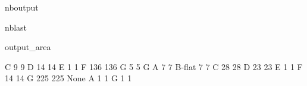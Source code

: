 \documentclass[letterpaper,10pt,english]{sphinxmanual}
\begin{document}
\begin{sphinxuseclass}{nboutput}
\begin{sphinxuseclass}{nblast}
{\begin{sphinxuseclass}{output_area}
\begin{sphinxuseclass}{}
\begin{sphinxVerbatim}[commandchars=\\\{\}]
                   C                          9                   9
                   D                         14                  14
                   E                          1                   1
                   F                        136                 136
                   G                          5                   5
G                  A                          7                   7
                   B-flat                     7                   7
                   C                         28                  28
                   D                         23                  23
                   E                          1                   1
                   F                         14                  14
                   G                        225                 225
None               A                          1                   1
                   G                          1                   1


\end{sphinxVerbatim}
\end{sphinxuseclass}
\end{sphinxuseclass}}
\end{sphinxuseclass}
\end{sphinxuseclass}
\end{document}
